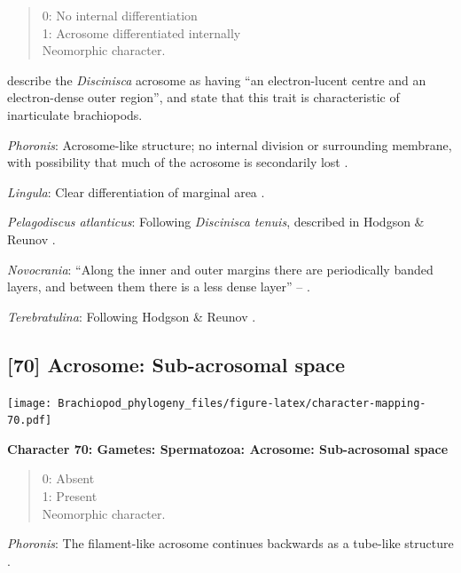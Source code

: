 \documentclass[openany]{book}
\theoremstyle{definition}
\theoremstyle{definition}
\theoremstyle{definition}
\theoremstyle{remark}
\begin{document}
\begin{quote}
0: No internal differentiation\\
1: Acrosome differentiated internally\\
Neomorphic character.
\end{quote}

\citet{Hodgson1994Ultrastructureof} describe the \emph{Discinisca}
acrosome as having ``an electron-lucent centre and an electron-dense
outer region'', and state that this trait is characteristic of
inarticulate brachiopods.

\emph{Phoronis}: Acrosome-like structure; no internal division or
surrounding membrane, with possibility that much of the acrosome is
secondarily lost \citep{Reunov2004Ultrastructuralstudy}.

\emph{Lingula}: Clear differentiation of marginal area
\citep{Fukumoto2003Theacrosome}.

\emph{Pelagodiscus atlanticus}: Following \emph{Discinisca}
\emph{tenuis}, described in Hodgson \& Reunov
\citeyearpar{Hodgson1994Ultrastructureof}.

\emph{Novocrania}: ``Along the inner and outer margins there are
periodically banded layers, and between them there is a less dense
layer'' -- \citet{Afzelius1978Finestructure}.

\emph{Terebratulina}: Following Hodgson \& Reunov
\citeyearpar{Hodgson1994Ultrastructureof}.

\hypertarget{acrosome-sub-acrosomal-space}{%
\subsection*{{[}70{]} Acrosome: Sub-acrosomal
space}\label{acrosome-sub-acrosomal-space}}

\texttt{[image: Brachiopod\_phylogeny\_files/figure-latex/character-mapping-70.pdf]}

\textbf{Character 70: Gametes: Spermatozoa: Acrosome: Sub-acrosomal
space}

\begin{quote}
0: Absent\\
1: Present\\
Neomorphic character.
\end{quote}

\emph{Phoronis}: The filament-like acrosome continues backwards as a
tube-like structure \citep[summarized in
\citet{Jamieson1991FishEvolution}]{Franzen1980Ultrastructureof}.
\end{document}
